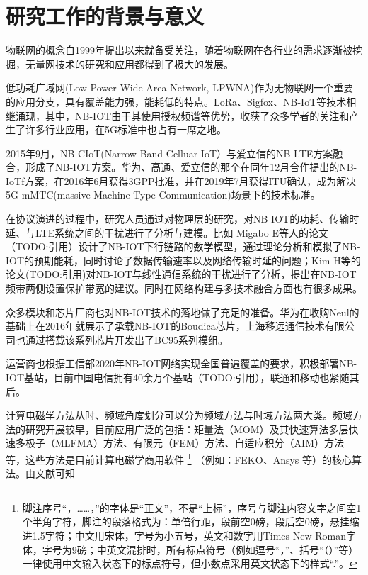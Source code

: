 \thesischapterexordium

\section{研究工作的背景与意义}

物联网的概念自1999年提出以来就备受关注，随着物联网在各行业的需求逐渐被挖掘，无量网技术的研究和应用都得到了极大的发展。


低功耗广域网(Low-Power Wide-Area Network, LPWNA)作为无物联网一个重要的应用分支，具有覆盖能力强，能耗低的特点。LoRa、Sigfox、NB-IoT等技术相继涌现，其中，NB-IOT由于其使用授权频谱等优势，收获了众多学者的关注和产生了许多行业应用，在5G标准中也占有一席之地。

2015年9月，NB-CIoT(Narrow Band Celluar IoT）与爱立信的NB-LTE方案融合，形成了NB-IOT方案。华为、高通、爱立信的那个在同年12月合作提出的NB-IoTf方案，在2016年6月获得3GPP批准，并在2019年7月获得ITU确认，成为解决5G mMTC(massive Machine Type Communication)场景下的技术标准。

在协议演进的过程中，研究人员通过对物理层的研究，对NB-IOT的功耗、传输时延、与LTE系统之间的干扰进行了分析与建模。比如 Migabo E等人的论文（TODO:引用）设计了NB-IOT下行链路的数学模型，通过理论分析和模拟了NB-IOT的预期能耗，同时讨论了数据传输速率以及网络传输时延的问题；Kim H等的论文(TODO:引用)对NB-IOT与线性通信系统的干扰进行了分析，提出在NB-IOT频带两侧设置保护带宽的建议。同时在网络构建与多技术融合方面也有很多成果。

众多模块和芯片厂商也对NB-IOT技术的落地做了充足的准备。华为在收购Neul的基础上在2016年就展示了承载NB-IOT的Boudica芯片，上海移远通信技术有限公司也通过搭载该系列芯片开发出了BC95系列模组。

运营商也根据工信部2020年NB-IOT网络实现全国普遍覆盖的要求，积极部署NB-IOT基站，目前中国电信拥有40余万个基站（TODO:引用），联通和移动也紧随其后。

计算电磁学方法从时、频域角度划分可以分为频域方法与时域方法两大类。频域方法的研究开展较早，目前应用广泛的包括：矩量法（MOM）及其快速算法多层快速多极子（MLFMA）方法、有限元（FEM）方法、自适应积分（AIM）方法等，这些方法是目前计算电磁学商用软件
\footnote{脚注序号“，……，”的字体是“正文”，不是“上标”，序号与脚注内容文字之间空1个半角字符，脚注的段落格式为：单倍行距，段前空0磅，段后空0磅，悬挂缩进1.5字符；中文用宋体，字号为小五号，英文和数字用Times New Roman字体，字号为9磅；中英文混排时，所有标点符号（例如逗号“，”、括号“（）”等）一律使用中文输入状态下的标点符号，但小数点采用英文状态下的样式“.”。}
（例如：FEKO、Ansys 等）的核心算法。由文献\cite{feng997he,clerc2010discrete,xiao2012yi}可知

